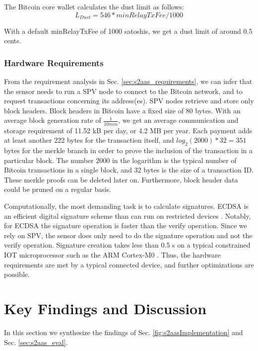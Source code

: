 The Bitcoin core wallet calculates the dust limit as follows:
\begin{equation*}
L_{Dust} = 546*minRelayTxFee/1000
\end{equation*}

With a default minRelayTxFee of 1000 satoshis, we get a dust limit of around 0.5 cents.

\subsubsection{Hardware Requirements}

From the requirement analysis in Sec. \ref{sec:s2aas_requirements}, we can infer that the sensor needs to run a \ac{SPV} node to connect to the Bitcoin network, and to request transactions concerning its address(es). \ac{SPV} nodes retrieve and store only block headers. Block headers in Bitcoin have a fixed size of 80 bytes. With an average block generation rate of $\frac{1}{10 min}$, we get an average communication and storage requirement of 11.52 kB per day, or 4.2 MB per year. Each payment adds at least another 222 bytes for the transaction itself, and $log_2(2000)*32=351$ bytes for the merkle branch in order to prove the inclusion of the transaction in a particular block. The number 2000 in the logarithm is the typical number of Bitcoin transactions in a single block, and 32 bytes is the size of a transaction ID. These merkle proofs can be deleted later on. Furthermore, block header data could be pruned on a regular basis.

Computationally, the most demanding task is to calculate signatures. \ac{ECDSA} is an efficient digital signature scheme than can run on restricted devices \parencite{fi3010031}. Notably, for \ac{ECDSA} the signature operation is faster than the verify operation. Since we rely on \ac{SPV}, the sensor does only need to do the signature operation and not the verify operation. Signature creation takes less than 0.5 s on a typical constrained \ac{IOT} microprocessor such as the ARM Cortex-M0 \parencite{ecdsaarm}. Thus, the hardware requirements are met by a typical connected device, and further optimizations are possible.

\section{Key Findings and Discussion}
\label{sec:s2aas_findings}

In this section we synthesize the findings of Sec. \ref{fig:s2aasImplementation} and Sec. \ref{sec:s2aas_eval}.

